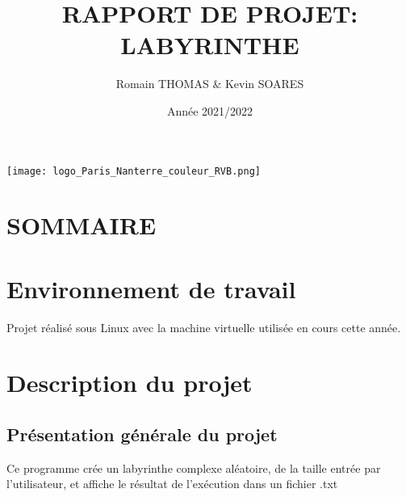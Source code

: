 \documentclass{article}
\title{RAPPORT DE PROJET: LABYRINTHE}
\author{Romain THOMAS & Kevin SOARES }
\date{Année 2021/2022}
\begin{document}
\maketitle
\texttt{[image: logo\_Paris\_Nanterre\_couleur\_RVB.png]}

\newpage
\section*{SOMMAIRE}
\tableofcontents
\newpage

\section{Environnement de travail}
Projet réalisé sous Linux avec la machine virtuelle utilisée en cours cette année.


\section{Description du projet}
\subsection{Présentation générale du projet}
Ce programme crée un labyrinthe complexe aléatoire, de la taille entrée par l'utilisateur, et affiche le résultat de l'exécution dans un fichier .txt
\end{document}
